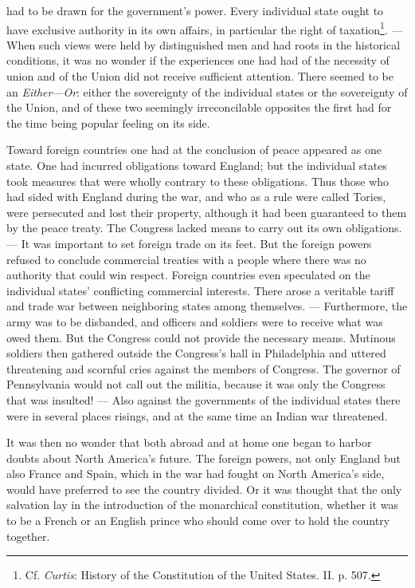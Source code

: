 \documentclass[12pt,a4paper,openany]{book}
\newcommand{\opage}[1]{\marginnote{\footnotesize\textit{[#1]}}}
\begin{document}
had to be drawn for the government's power. Every individual state
ought to have exclusive authority in its own affairs,
in particular the right of taxation\footnote{Cf. \emph{Curtis}: History of the Constitution of the United States.
II. p. 507.}. --- When such views
were held by distinguished men and had roots in the historical
conditions, it was no wonder if the experiences one had
had of the necessity of union and of the Union did not
receive sufficient attention. There seemed to be an
\emph{Either}---\emph{Or}: either the sovereignty of the individual states or the sovereignty
of the Union, and of these two seemingly irreconcilable
opposites the first had for the time being popular feeling on its side.

Toward foreign countries one had at the conclusion of peace appeared
as one state. One had incurred obligations toward
England; but the individual states took measures that
were wholly contrary to these obligations. Thus those who
had sided with England during the war, and who as a rule were
called Tories, were persecuted and lost their property, although
it had been guaranteed to them by the peace treaty. The Congress
lacked means to carry out its own obligations.
--- It was important to set foreign trade on its feet.
But the foreign powers refused to conclude
commercial treaties with a people where there was no authority
that could win respect. Foreign countries even speculated
on the individual states' conflicting commercial interests. There
arose a veritable tariff and trade war between neighboring states
among themselves. --- Furthermore, the army was to be disbanded, and officers
and soldiers were to receive what was owed them. But the Congress
could not provide the necessary means. Mutinous
soldiers then gathered outside the Congress's hall in
Philadelphia and uttered threatening and scornful cries against the
members of Congress. The governor of Pennsylvania would not
\opage{124}call out the militia, because it was only the Congress that
was insulted! --- Also against the governments of the individual states there were in several
places risings, and at the same time an Indian war threatened.

It was then no wonder that both abroad and
at home one began to harbor doubts about North America's future.
The foreign powers, not only England but also France
and Spain, which in the war had fought on North America's
side, would have preferred to see the country divided. Or it was thought that the
only salvation lay in the introduction of the monarchical
constitution, whether it was to be a French or an English prince
who should come over to hold the country together.
\end{document}
